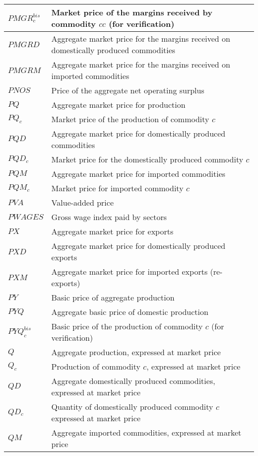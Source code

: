\documentclass[12pt]{article}
\numberwithin{equation}{section}
\begin{document}
\begin{longtable}{@{}p{4cm}p{9cm}@{}}
 \midrule 
$PMGR^{bis}_{c}$ & Market price of the margins received by commodity $cc$ (for verification) \\
 \midrule 
$PMGRD$ & Aggregate market price for the margins received on domestically produced commodities \\
 \midrule 
$PMGRM$ & Aggregate market price for the margins received on imported commodities \\
 \midrule 
$PNOS$ & Price of the aggregate net operating surplus \\
 \midrule 
$PQ$ & Aggregate market price for production \\
 \midrule 
$PQ_{c}$ & Market price of the production of commodity $c$ \\
 \midrule 
$PQD$ & Aggregate market price for domestically produced commodities \\
 \midrule 
$PQD_{c}$ & Market price for the domestically produced commodity $c$ \\
 \midrule 
$PQM$ & Aggregate market price for imported commodities \\
 \midrule 
$PQM_{c}$ & Market price for imported commodity $c$ \\
 \midrule 
$PVA$ & Value-added price \\
 \midrule 
$PWAGES$ & Gross wage index paid by sectors \\
 \midrule 
$PX$ & Aggregate market price for exports \\
 \midrule 
$PXD$ & Aggregate market price for domestically produced exports \\
 \midrule 
$PXM$ & Aggregate market price for imported exports (re-exports) \\
 \midrule 
$PY$ & Basic price of aggregate production \\
 \midrule 
$PYQ$ & Aggregate basic price of domestic production \\
 \midrule 
$PYQ^{bis}_{c}$ & Basic price of the production of commodity $c$ (for verification) \\
 \midrule 
$Q$ & Aggregate production, expressed at market price \\
 \midrule 
$Q_{c}$ & Production of commodity $c$, expressed at market price \\
 \midrule 
$QD$ & Aggregate domestically produced commodities, expressed at market price \\
 \midrule 
$QD_{c}$ & Quantity of domestically produced commodity $c$ expressed at market price \\
 \midrule 
$QM$ & Aggregate imported commodities, expressed at market price \\

\end{longtable}
\end{document}

